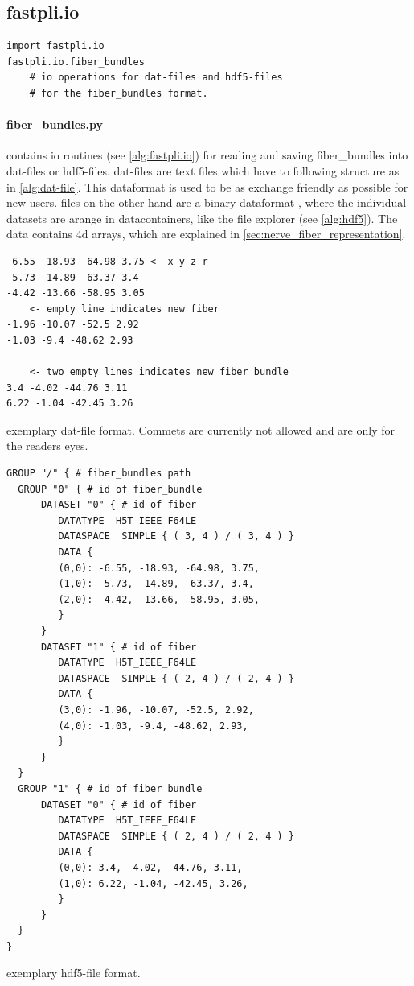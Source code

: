 \subsection{fastpli.io}
\begin{lstfloat}[!t]
\lstset{style=python}
\begin{lstlisting}
import fastpli.io
fastpli.io.fiber_bundles
    # io operations for dat-files and hdf5-files
    # for the fiber_bundles format.
\end{lstlisting}
\caption{}\label{alg:fastpli.io}
\end{lstfloat}
% 
\paragraph{fiber\_bundles.py} contains io routines (see \cref{alg:fastpli.io}) for reading and saving fiber\_bundles into dat-files or hdf5-files. dat-files are text files which have to following structure as in \cref{alg:dat-file}. This dataformat is used to be as exchange friendly as possible for new users. \hdf{} files on the other hand are a binary dataformat \cite{hdf5}, where the individual datasets are arange in datacontainers, like the file explorer (see \cref{alg:hdf5}). The data contains 4d arrays, which are explained in \cref{sec:nerve_fiber_representation}.
% 
\begin{lstfloat}[!t]
\begin{lstlisting}
-6.55 -18.93 -64.98 3.75 <- x y z r
-5.73 -14.89 -63.37 3.4
-4.42 -13.66 -58.95 3.05
    <- empty line indicates new fiber
-1.96 -10.07 -52.5 2.92
-1.03 -9.4 -48.62 2.93

    <- two empty lines indicates new fiber bundle
3.4 -4.02 -44.76 3.11
6.22 -1.04 -42.45 3.26
\end{lstlisting}
\caption{exemplary dat-file format. Commets are currently not allowed and are only for the readers eyes.}\label{alg:dat-file}
\end{lstfloat}
% 
\begin{lstfloat}[!t]
\lstset{style=common}
\begin{lstlisting}
GROUP "/" { # fiber_bundles path
  GROUP "0" { # id of fiber_bundle
      DATASET "0" { # id of fiber
         DATATYPE  H5T_IEEE_F64LE
         DATASPACE  SIMPLE { ( 3, 4 ) / ( 3, 4 ) }
         DATA {
         (0,0): -6.55, -18.93, -64.98, 3.75,
         (1,0): -5.73, -14.89, -63.37, 3.4,
         (2,0): -4.42, -13.66, -58.95, 3.05,
         }
      }
      DATASET "1" { # id of fiber
         DATATYPE  H5T_IEEE_F64LE
         DATASPACE  SIMPLE { ( 2, 4 ) / ( 2, 4 ) }
         DATA {
         (3,0): -1.96, -10.07, -52.5, 2.92,
         (4,0): -1.03, -9.4, -48.62, 2.93,
         }
      }
  }
  GROUP "1" { # id of fiber_bundle
      DATASET "0" { # id of fiber
         DATATYPE  H5T_IEEE_F64LE
         DATASPACE  SIMPLE { ( 2, 4 ) / ( 2, 4 ) }
         DATA {
         (0,0): 3.4, -4.02, -44.76, 3.11,
         (1,0): 6.22, -1.04, -42.45, 3.26,
         }
      }
  }
}
\end{lstlisting}
\caption{exemplary hdf5-file format.} \label{alg:hdf5}
\end{lstfloat}
% 
% 
